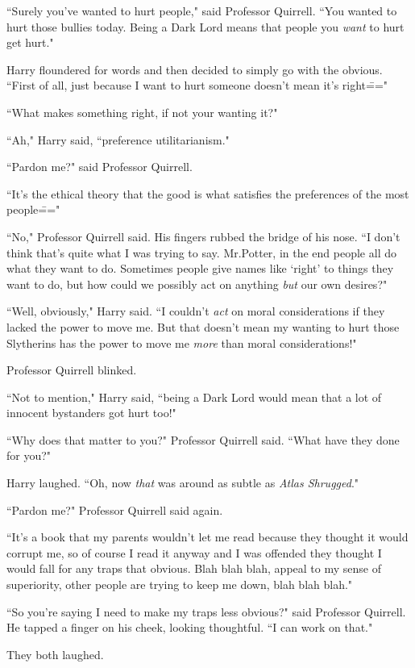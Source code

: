 ``Surely you've wanted to hurt people," said Professor Quirrell. ``You wanted to hurt those bullies today. Being a Dark Lord means that people you \emph{want} to hurt get hurt."

Harry floundered for words and then decided to simply go with the obvious. ``First of all, just because I want to hurt someone doesn't mean it's right\==="

``What makes something right, if not your wanting it?"

``Ah," Harry said, ``preference utilitarianism."

``Pardon me?" said Professor Quirrell.

``It's the ethical theory that the good is what satisfies the preferences of the most people\==="

``No," Professor Quirrell said. His fingers rubbed the bridge of his nose. ``I don't think that's quite what I was trying to say. Mr.\?Potter, in the end people all do what they want to do. Sometimes people give names like `right' to things they want to do, but how could we possibly act on anything \emph{but} our own desires?"

``Well, obviously," Harry said. ``I couldn't \emph{act} on moral considerations if they lacked the power to move me. But that doesn't mean my wanting to hurt those Slytherins has the power to move me \emph{more} than moral considerations!"

Professor Quirrell blinked.

``Not to mention," Harry said, ``being a Dark Lord would mean that a lot of innocent bystanders got hurt too!"

``Why does that matter to you?" Professor Quirrell said. ``What have they done for you?"

Harry laughed. ``Oh, now \emph{that} was around as subtle as \emph{Atlas Shrugged}."

``Pardon me?" Professor Quirrell said again.

``It's a book that my parents wouldn't let me read because they thought it would corrupt me, so of course I read it anyway and I was offended they thought I would fall for any traps that obvious. Blah blah blah, appeal to my sense of superiority, other people are trying to keep me down, blah blah blah."

``So you're saying I need to make my traps less obvious?" said Professor Quirrell. He tapped a finger on his cheek, looking thoughtful. ``I can work on that."

They both laughed.

